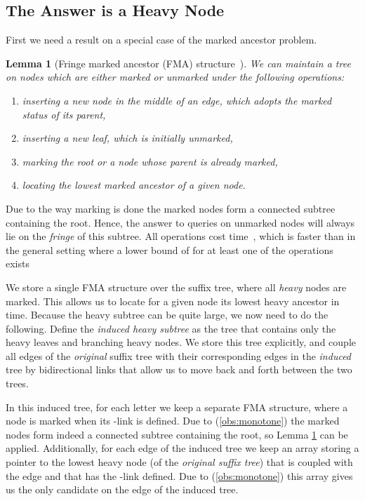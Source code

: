 \documentclass[11pt,onecolumn,final]{article} \usepackage{a4}
\theoremstyle{plain}
\newtheorem{lemma}[definition]{Lemma}
\theoremstyle{remark}
\begin{document}
\subsection{The Answer is a Heavy Node}
First we need a result on a special case of the marked ancestor problem.

\begin{lemma}[Fringe marked ancestor (FMA) structure~\cite{Breslauer11fringe}]
  \label{lem:fringe}
  We can maintain a tree  on  nodes which are either marked or unmarked under the following operations:
  \begin{enumerate}
  \item inserting a new node in the middle of an edge, which adopts the marked status of its parent,
  \item inserting a new leaf, which is initially unmarked,
  \item marking the root or a node whose parent is already marked,
  \item locating the lowest marked ancestor of a given node.
  \end{enumerate}
\end{lemma}

Due to the way marking is done the marked nodes form a connected subtree containing the root. Hence, the answer to queries on unmarked nodes will always lie on the \emph{fringe} of this subtree. All operations cost  time~\cite{Breslauer11fringe},
which is faster than in the general setting where a lower bound of  for at least one of the operations exists~\cite{alstrup98marked}

We store a single FMA structure over the suffix tree, where all \emph{heavy} nodes are marked. This allows us to locate for a given node  its lowest heavy ancestor  in  time. Because the heavy subtree can be quite large, we now need to do the following. Define the \emph{induced heavy subtree} as the tree that contains only the heavy leaves and branching heavy nodes. We store this tree explicitly, and couple all edges of the \emph{original} suffix tree with their corresponding edges in the \emph{induced} tree by bidirectional links that allow us to move back and forth between the two trees.

In this induced tree, for each letter  we keep a separate FMA structure, where a node is marked when its -link is defined.
Due to (\ref{obs:monotone}) the marked nodes form indeed a connected subtree containing the root, so Lemma \ref{lem:fringe} can be applied.
Additionally, for each edge of the induced tree we keep an array  storing a pointer to the lowest heavy node (of the \emph{original suffix tree}) that is coupled with the edge and that has the -link defined. Due to (\ref{obs:monotone}) this array gives us the only candidate on the edge of the induced tree.
\end{document}
